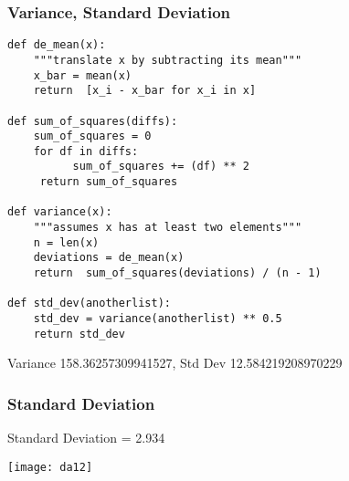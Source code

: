  


\begin{frame}[fragile]\frametitle{Variance, Standard Deviation}
\begin{lstlisting}
def de_mean(x):
	"""translate x by subtracting its mean"""
	x_bar = mean(x)
	return	[x_i - x_bar for x_i in x]

def sum_of_squares(diffs):
	sum_of_squares = 0
	for df in diffs:
          sum_of_squares += (df) ** 2
     return sum_of_squares

def variance(x):
	"""assumes x has at	least two elements"""
	n = len(x)
	deviations = de_mean(x)
	return	sum_of_squares(deviations) / (n - 1)
 
def std_dev(anotherlist):
	std_dev = variance(anotherlist) ** 0.5
	return std_dev
\end{lstlisting}
Variance 158.36257309941527, Std Dev 12.584219208970229
\end{frame}



\begin{frame}[fragile]\frametitle{Standard Deviation}	
Standard Deviation = 2.934
\begin{center}
\texttt{[image: da12]}
\end{center}
\end{frame}

